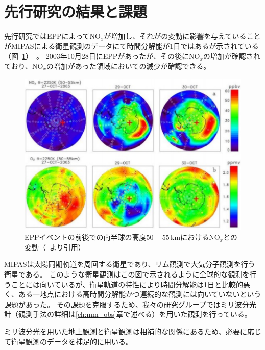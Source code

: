 \section{先行研究の結果と課題}
\label{sec:intro_privious}
先行研究ではEPPによって$\mathrm{NO}_x$が増加し、それがの変動に影響を与えていることがMIPASによる衛星観測のデータにて時間分解能が1日ではあるが示されている（図~\ref{fig:lopez2005observation_fig3}）~\cite{lopez2005observation}。
2003年10月28日にEPPがあったが、その後に$\mathrm{NO}_x$の増加が確認されており、$\mathrm{NO}_x$の増加があった領域においての減少が確認できる。
\begin{figure}[htbp]
    \centering
    \includegraphics[width=\linewidth]{master_thesis_contents/master_thesis_fig/lopez2005observation_fig3.pdf}
    \caption{EPPイベントの前後での南半球の高度$50-55\, \mathrm{km}$における$\mathrm{NO}_x$との変動（~\cite{lopez2005observation}より引用）}
    \label{fig:lopez2005observation_fig3}
\end{figure}
MIPASは太陽同期軌道を周回する衛星であり、リム観測で大気分子観測を行う衛星である。
このような衛星観測はこの図で示されるように全球的な観測を行うことには向いているが、衛星軌道の特性により時間分解能は1日と比較的悪く、ある一地点における高時間分解能かつ連続的な観測には向いていないという課題があった。
その課題を克服するため、我々の研究グループではミリ波分光計（観測手法の詳細は\ref{ch:mm_obs}章で述べる）を用いた観測を行っている。\par
ミリ波分光を用いた地上観測と衛星観測は相補的な関係にあるため、必要に応じて衛星観測のデータを補足的に用いる。

